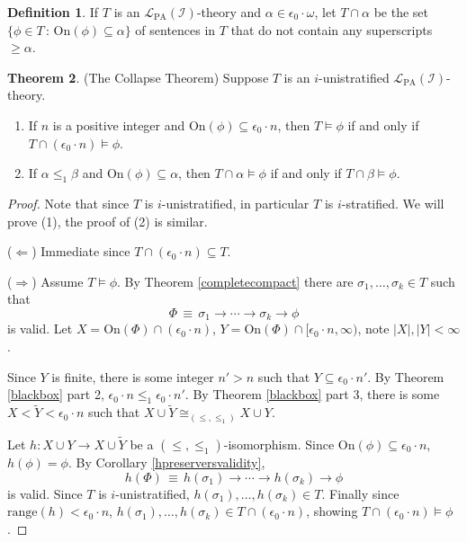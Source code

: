 \documentclass[reqno]{article}
\theoremstyle{definition}
\newtheorem{theorem}{Theorem}
\newtheorem{definition}[theorem]{Definition}
\def\L{\mathscr{L}}
\def\LPA{\L_{\mathrm{PA}}}
\def\epom{\epsilon_0\cdot\omega}
\def\indset{\mathcal I}
\def\onset{\mathrm{On}}
\begin{document}
\begin{definition}
If $T$ is an $\LPA(\indset)$-theory and $\alpha\in\epom$,
let $T\cap\alpha$ be the set $\{\phi\in T\,:\,\onset(\phi)\subseteq\alpha\}$ of sentences in $T$ that do not contain
any superscripts $\geq\alpha$.
\end{definition}



\begin{theorem}
\label{collapsetheorem}
(The Collapse Theorem)
Suppose $T$ is an $i$-unistratified $\LPA(\indset)$-theory.
\begin{enumerate}
\item If $n$ is a positive integer and $\onset(\phi)\subseteq\epsilon_0\cdot n$, then $T\models\phi$
if and only if $T\cap(\epsilon_0\cdot n)\models\phi$.
\item If $\alpha\leq_1\beta$ and $\onset(\phi)\subseteq\alpha$, then $T\cap\alpha\models\phi$
if and only if $T\cap\beta\models\phi$.
\end{enumerate}
\end{theorem}

\begin{proof}
Note that since $T$ is $i$-unistratified, in particular $T$ is $i$-stratified.
We will prove (1), the proof of (2) is similar.
\item
($\Leftarrow$) Immediate since $T\cap(\epsilon_0\cdot n)\subseteq T$.

\item
($\Rightarrow$)
Assume $T\models\phi$.
By Theorem \ref{completecompact} there are $\sigma_1,\ldots,\sigma_k\in T$
such that
\[
\Phi \,\equiv\, \sigma_1\rightarrow\cdots\rightarrow \sigma_k\rightarrow\phi
\]
is valid.
Let $X=\onset(\Phi)\cap(\epsilon_0\cdot n)$, $Y=\onset(\Phi)\cap[\epsilon_0\cdot n,\infty)$, note $|X|,|Y|<\infty$.

Since $Y$ is finite, there is some integer $n'>n$ such that $Y\subseteq\epsilon_0\cdot n'$.
By Theorem \ref{blackbox} part 2, $\epsilon_0\cdot n\leq_1\epsilon_0\cdot n'$.
By Theorem \ref{blackbox} part 3, there is some $X<\widetilde Y<\epsilon_0\cdot n$ such that
$X\cup\widetilde Y\cong_{(\leq,\leq_1)}X\cup Y$.

Let $h:X\cup Y\to X\cup\widetilde Y$ be a $(\leq,\leq_1)$-isomorphism.
Since $\onset(\phi)\subseteq\epsilon_0\cdot n$, $h(\phi)=\phi$.
By Corollary \ref{hpreserversvalidity},
\[
h(\Phi)\,\equiv\, h(\sigma_1)\rightarrow\cdots\rightarrow h(\sigma_k)\rightarrow \phi
\]
is valid.
Since $T$ is $i$-unistratified, $h(\sigma_1),\ldots,h(\sigma_k)\in T$.
Finally since $\mathrm{range}(h)<\epsilon_0\cdot n$, $h(\sigma_1),\ldots,h(\sigma_k)\in T\cap(\epsilon_0\cdot n)$,
showing $T\cap(\epsilon_0\cdot n)\models \phi$.
\end{proof}
\end{document}
